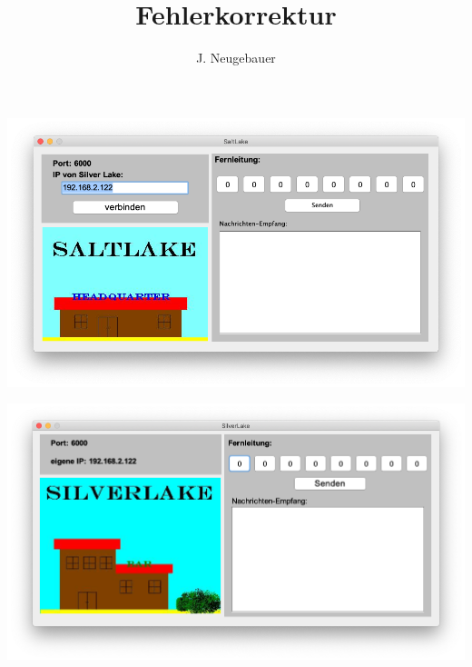 \documentclass[10pt, a4paper]{scrartcl}
\author{J. Neugebauer}
\title{Fehlerkorrektur}
\date{\Heute}
\begin{document}
\ReiheTitel

\begin{multicols}{2}\centering
	\vspace*{2mm}
	\includegraphics[width=.8\columnwidth]{Q2-GK-AB.II.2-Abb_Saltlake.png}
	
	\includegraphics[width=.8\columnwidth]{Q2-GK-AB.II.2-Abb_Silver Lake.png}
\end{multicols}
\end{document}
